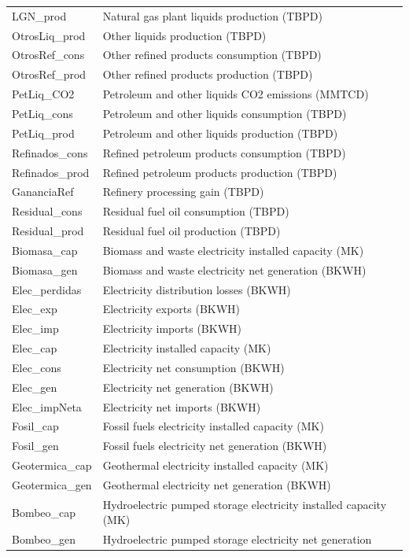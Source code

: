\documentclass[oneside, openany, fontset=libertinus]{mitthesis}
\begin{document}
\begin{longtable}[]{@{}
  >{\raggedright\arraybackslash}p{}
  >{\raggedright\arraybackslash}p{}@{}}
LGN\_prod & Natural gas plant liquids production (TBPD) \\
OtrosLiq\_prod & Other liquids production (TBPD) \\
OtrosRef\_cons & Other refined products consumption (TBPD) \\
OtrosRef\_prod & Other refined products production (TBPD) \\
PetLiq\_CO2 & Petroleum and other liquids CO2 emissions (MMTCD) \\
PetLiq\_cons & Petroleum and other liquids consumption (TBPD) \\
PetLiq\_prod & Petroleum and other liquids production (TBPD) \\
Refinados\_cons & Refined petroleum products consumption (TBPD) \\
Refinados\_prod & Refined petroleum products production (TBPD) \\
GananciaRef & Refinery processing gain (TBPD) \\
Residual\_cons & Residual fuel oil consumption (TBPD) \\
Residual\_prod & Residual fuel oil production (TBPD) \\
Biomasa\_cap & Biomass and waste electricity installed capacity (MK) \\
Biomasa\_gen & Biomass and waste electricity net generation (BKWH) \\
Elec\_perdidas & Electricity distribution losses (BKWH) \\
Elec\_exp & Electricity exports (BKWH) \\
Elec\_imp & Electricity imports (BKWH) \\
Elec\_cap & Electricity installed capacity (MK) \\
Elec\_cons & Electricity net consumption (BKWH) \\
Elec\_gen & Electricity net generation (BKWH) \\
Elec\_impNeta & Electricity net imports (BKWH) \\
Fosil\_cap & Fossil fuels electricity installed capacity (MK) \\
Fosil\_gen & Fossil fuels electricity net generation (BKWH) \\
Geotermica\_cap & Geothermal electricity installed capacity (MK) \\
Geotermica\_gen & Geothermal electricity net generation (BKWH) \\
Bombeo\_cap & Hydroelectric pumped storage electricity installed
capacity (MK) \\
Bombeo\_gen & Hydroelectric pumped storage electricity net generation

\end{longtable}
\end{document}
